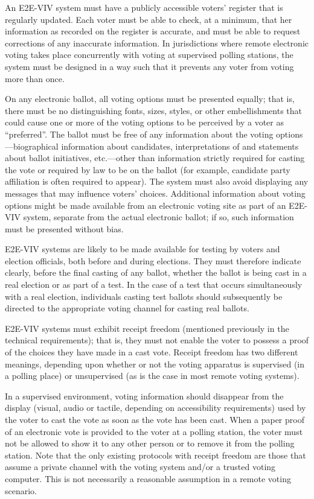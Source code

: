 An E2E-VIV system must have a publicly accessible voters' register
that is regularly updated. Each voter must be able to check, at a
minimum, that her information as recorded on the register is accurate,
and must be able to request corrections of any inaccurate
information. In jurisdictions where remote electronic voting takes
place concurrently with voting at supervised polling stations, the
system must be designed in a way such that it prevents any voter from
voting more than once.

On any electronic ballot, all voting options must be presented
equally; that is, there must be no distinguishing fonts, sizes,
styles, or other embellishments that could cause one or more of the
voting options to be perceived by a voter as ``preferred''. The ballot
must be free of any information about the voting
options---biographical information about candidates, interpretations
of and statements about ballot initiatives, etc.---other than
information strictly required for casting the vote or required by law
to be on the ballot (for example, candidate party affiliation is often
required to appear). The system must also avoid displaying any
messages that may influence voters' choices. Additional information
about voting options might be made available from an electronic voting
site as part of an E2E-VIV system, separate from the actual electronic
ballot; if so, such information must be presented without bias.

E2E-VIV systems are likely to be made available for testing by voters
and election officials, both before and during elections. They must
therefore indicate clearly, before the final casting of any ballot,
whether the ballot is being cast in a real election or as part of a
test. In the case of a test that occurs simultaneously with a real
election, individuals casting test ballots should subsequently be
directed to the appropriate voting channel for casting real ballots.

E2E-VIV systems must exhibit receipt freedom (mentioned previously in
the technical requirements); that is, they must not enable the voter
to possess a proof of the choices they have made in a cast
vote. Receipt freedom has two different meanings, depending upon
whether or not the voting apparatus is supervised (in a polling place)
or unsupervised (as is the case in most remote voting systems).

In a supervised environment, voting information should disappear from
the display (visual, audio or tactile, depending on accessibility
requirements) used by the voter to cast the vote as soon as the vote
has been cast. When a paper proof of an electronic vote is provided to
the voter at a polling station, the voter must not be allowed to show
it to any other person or to remove it from the polling station. Note
that the only existing protocols with receipt freedom are those that
assume a private channel with the voting system and/or a trusted
voting computer. This is not necessarily a reasonable assumption in a
remote voting scenario.


